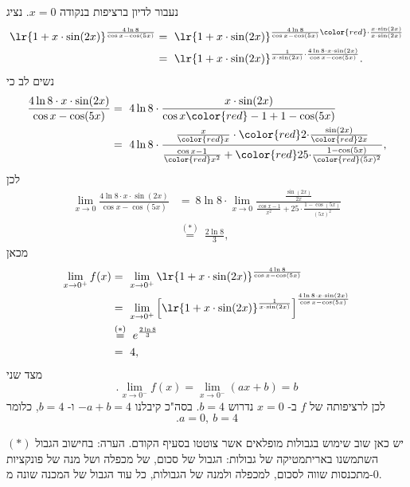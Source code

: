 \begin{enumerate}
\begin{solbox}
נעבור לדיון ברציפות בנקודה
$x=0$.
נציג
\begin{align*}
    \lr{1+x\cdot\sin(2x)}^{\frac{4\ln 8}{\cos x-\cos (5x)}}&=\ \lr{1+x\cdot\sin(2x)}^{\frac{4\ln 8}{\cos x-\cos (5x)}{\color{red}\cdot\frac{x\cdot\sin(2x)}{x\cdot\sin(2x)}}}\\
    &=\ \lr{1+x\cdot\sin(2x)}^{\frac{1}{{x\cdot\sin(2x)}}\cdot\frac{4\ln 8\cdot x\cdot\sin(2x)}{\cos x-\cos (5x)}}.
\end{align*}
נשים לב כי
\begin{align*}
    \frac{4\ln 8\cdot x\cdot\sin(2x)}{\cos x-\cos (5x)}&=\ 4\ln 8\cdot\frac{ x\cdot\sin(2x)}{\cos x{\color{red}-1+1}-\cos (5x)}\\
    &=\ 4\ln 8\cdot\frac{\frac{x}{\color{red}x}\cdot{\color{red}2\cdot}\frac{\sin(2x)}{\color{red}2x}}{\frac{\cos x-1}{\color{red}x^2}+{\color{red}25\cdot}\frac{1-\cos (5x)}{\color{red}(5x)^2}},
\end{align*}
לכן
\begin{align*}
    \lim_{x\to0}\frac{4\ln 8\cdot x\cdot\sin(2x)}{\cos x-\cos (5x)}&=\ 8\ln 8\cdot\lim_{x\to0}\frac{\frac{\sin(2x)}{2x}}{\frac{\cos x-1}{x^2}+{25\cdot}\frac{1-\cos (5x)}{(5x)^2}}\\
    &\overset{(\ast)}{=}\ \frac{2\ln 8}{3},
\end{align*}
מכאן
\begin{align*}
    \lim_{x\to0^+}f(x)&=\ \lim_{x\to0^+}\lr{1+x\cdot\sin(2x)}^{\frac{4\ln 8}{\cos x-\cos (5x)}}\\
    &=\ \lim_{x\to0^+}\left[\lr{1+x\cdot\sin(2x)}^{\frac{1}{x\cdot\sin(2x)}}\right]^{\frac{4\ln 8\cdot x\cdot\sin(2x)}{\cos x-\cos (5x)}}\\
    &\overset{(\ast)}{=}\ e^\frac{2\ln 8}{3}\\
    &=\ 4,
\end{align*}
מצד שני
$$.\lim_{x\to0^-}f(x)=\lim_{x\to0^-}(ax+b)=b$$
לכן לרציפותה של
$f$
ב-
$x=0$
נדרוש
$b=4$.
בסה"כ קיבלנו
$-a+b=4$
ו-
$b=4$,
כלומר
$$. a=0,\ b=4$$

$(\ast)$ יש כאן שוב שימוש בגבולות מופלאים
אשר צוטטו בסעיף הקודם.
הערה: בחישוב הגבול השתמשנו באריתמטיקה של גבולות: הגבול של סכום, של מכפלה ושל מנה של פונקציות מתכנסות שווה לסכום, למכפלה ולמנה של הגבולות, כל עוד הגבול של המכנה שונה מ-$0$.
\end{solbox}


\end{enumerate}
